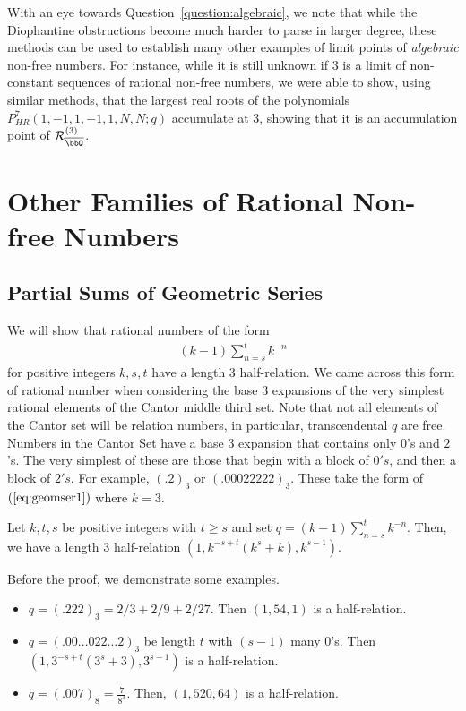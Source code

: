 \documentclass[11 pt]{amsart}
\begin{document}
With an eye towards Question~\ref{question:algebraic}, we note that while the Diophantine obstructions become much harder to parse in larger degree, these methods can be used to establish many other examples of limit points of \textit{algebraic} non-free numbers. For instance, while it is still unknown if $3$ is a limit of non-constant sequences of rational non-free numbers, we were able to show, using similar methods, that the largest real roots of the polynomials $P^7_{HR}(1,-1,1,-1,1,N,N;q)$ accumulate at $3$, showing that it is an accumulation point of $\mathcal{R}_{\overline{\bbQ}}^{(3)}$.

\section{Other Families of Rational Non-free Numbers}

\subsection{Partial Sums of Geometric Series}\label{PartialSumsSubSection}

We will show that rational numbers of the form
\begin{align}\label{eq:geomser1}
    (k-1)\sum_{n = s}^tk^{-n}
\end{align}
for positive integers $k, s, t$  have a length $3$ half-relation. We came across this form of rational number when considering the base $3$ expansions of the very simplest rational elements of the Cantor middle third set. Note that not all elements of the Cantor set will be relation numbers, in particular, transcendental $q$ are free. Numbers in the Cantor Set have a base $3$ expansion that contains only $0$'s and $2$'s. The very simplest of these are those that begin with a block of $0's$, and then a block of $2's$. For example, $(.2)_3$ or $(.00022222)_3$. These take the form of $(\ref{eq:geomser1})$ where $k = 3$. 

\begin{proposition}
    Let $k, t, s$ be positive integers with $t \ge s$ and set $q = (k-1)\sum_{n = s}^tk^{-n}$. Then, we have a length $3$ half-relation $(1, k^{-s + t}(k^s + k), k^{s - 1})$.
\end{proposition}

\begin{example} Before the proof, we demonstrate some examples.
    \begin{itemize}
        \item $q = (.222)_3 = 2/3 + 2/9 + 2/27$. Then $(1, 54, 1)$ is a half-relation.
        \item $q = (.00\ldots 022\ldots2)_3 $ be length $t$ with $(s - 1)$ many $0$'s. Then $(1, 3^{-s + t}(3^s + 3), 3^{s-1})$ is a half-relation.
        \item $q = (.007)_8 = \frac{7}{8^3}$. Then, $(1, 520, 64)$ is a half-relation.
        
    \end{itemize}
\end{example}
\end{document}
